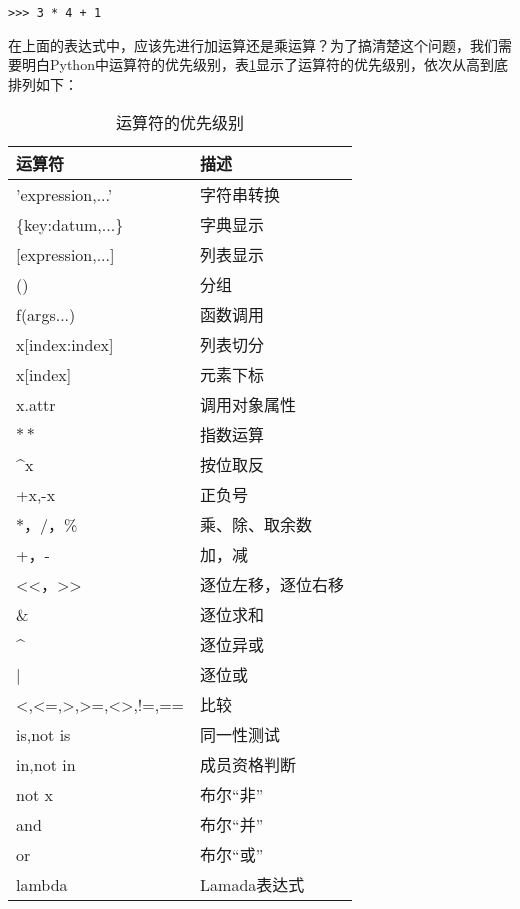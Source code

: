 \begin{lstlisting}
>>> 3 * 4 + 1
\end{lstlisting}

在上面的表达式中，应该先进行加运算还是乘运算？为了搞清楚这个问题，我们需要明白Python中运算符的优先级别，表\ref{tab:运算符的优先级别}显示了运算符的优先级别，依次从高到底排列如下：

\begin{table}[ht]
  \centering
  \caption{运算符的优先级别}
    \begin{tabular}{ll}
    \toprule
    运算符               & 描述 \\
    \midrule
    'expression,...'    & 字符串转换 \\
    \{key:datum,...\}   & 字典显示 \\
    {[expression,...]}  & 列表显示 \\
    ()                  & 分组 \\
    f(args...)          & 函数调用 \\
    x[index:index]      & 列表切分 \\
    x[index]            & 元素下标 \\
    x.attr              & 调用对象属性 \\
    $**$                & 指数运算 \\
    {\^{}x}             & 按位取反 \\
    +x,-x               & 正负号 \\
    $*$，/，\%          & 乘、除、取余数 \\
    +，-                & 加，减 \\
    <<，>>              & 逐位左移，逐位右移 \\
    \&                  & 逐位求和 \\
    {\^{}}              & 逐位异或 \\
    |                   & 逐位或 \\
    <,<=,>,>=,<>,!=,==  & 比较  \\
    is,not is           & 同一性测试 \\
    in,not in           & 成员资格判断 \\
    not x               & 布尔“非” \\
    and                 & 布尔“并” \\
    or                  & 布尔“或” \\
    lambda              & Lamada表达式 \\
    \bottomrule
    \end{tabular}%
  \label{tab:运算符的优先级别}%
\end{table}%


